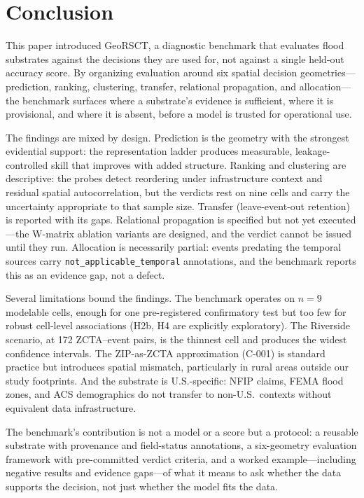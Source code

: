 \section{Conclusion}
\label{sec:conclusion}

This paper introduced GeoRSCT, a diagnostic benchmark that evaluates
flood substrates against the decisions they are used for, not against a
single held-out accuracy score. By organizing evaluation around six
spatial decision geometries---prediction, ranking, clustering, transfer,
relational propagation, and allocation---the benchmark surfaces where a
substrate's evidence is sufficient, where it is provisional, and where
it is absent, before a model is trusted for operational use.

The findings are mixed by design. Prediction is the geometry with the
strongest evidential support: the representation ladder produces
measurable, leakage-controlled skill that improves with added structure.
Ranking and clustering are descriptive: the probes detect reordering
under infrastructure context and residual spatial autocorrelation, but
the verdicts rest on nine cells and carry the uncertainty appropriate to
that sample size. Transfer (leave-event-out retention) is reported with
its gaps. Relational propagation is specified but not yet executed---the
W-matrix ablation variants are designed, and the verdict cannot be issued
until they run. Allocation is necessarily partial: events predating the
temporal sources carry \texttt{not\_applicable\_temporal} annotations,
and the benchmark reports this as an evidence gap, not a defect.

Several limitations bound the findings. The benchmark operates on
$n{=}9$ modelable cells, enough for one pre-registered confirmatory
test but too few for robust cell-level associations (H2b, H4 are
explicitly exploratory). The Riverside scenario, at 172 ZCTA--event
pairs, is the thinnest cell and produces the widest confidence
intervals. The ZIP-as-ZCTA approximation (C-001) is standard practice
but introduces spatial mismatch, particularly in rural areas outside
our study footprints. And the substrate is U.S.-specific: NFIP claims,
FEMA flood zones, and ACS demographics do not transfer to non-U.S.\
contexts without equivalent data infrastructure.

The benchmark's contribution is not a model or a score but a protocol:
a reusable substrate with provenance and field-status annotations, a
six-geometry evaluation framework with pre-committed verdict criteria,
and a worked example---including negative results and evidence
gaps---of what it means to ask whether the data supports the decision,
not just whether the model fits the data.
